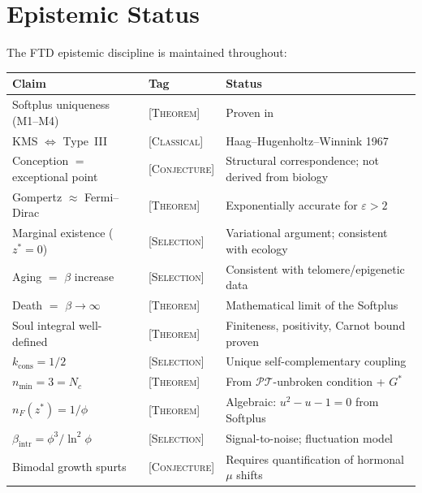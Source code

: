 \documentclass[12pt, letterpaper]{article}
\theoremstyle{plain}
\theoremstyle{definition}
\theoremstyle{remark}
\newcommand{\Gstar}{{G^{*}}}              %
\newcommand{\nF}{n_{\!F}}                 %
\begin{document}
\section{Epistemic Status}
\label{sec:epistemics}

The FTD epistemic discipline is maintained throughout:

\begin{center}
\renewcommand{\arraystretch}{1.35}
\small
\begin{tabular}{@{}llp{6.8cm}@{}}
\toprule
\textbf{Claim} & \textbf{Tag} & \textbf{Status} \\
\midrule
Softplus uniqueness (M1--M4) & \textsc{[Theorem]} & Proven in~\cite{ReLU} \\
KMS $\Leftrightarrow$ Type~III & \textsc{[Classical]} & Haag--Hugenholtz--Winnink 1967 \\
Conception $=$ exceptional point & \textsc{[Conjecture]} & Structural correspondence; not derived from biology \\
Gompertz $\approx$ Fermi--Dirac & \textsc{[Theorem]} & Exponentially accurate for $\varepsilon > 2$ \\
Marginal existence ($z^* = 0$) & \textsc{[Selection]} & Variational argument; consistent with ecology \\
Aging $=$ $\beta$ increase & \textsc{[Selection]} & Consistent with telomere/epigenetic data \\
Death $=$ $\beta \to \infty$ & \textsc{[Theorem]} & Mathematical limit of the Softplus \\
Soul integral well-defined & \textsc{[Theorem]} & Finiteness, positivity, Carnot bound proven \\
$k_{\text{cons}} = 1/2$ & \textsc{[Selection]} & Unique self-complementary coupling \\
$n_{\min} = 3 = N_c$ & \textsc{[Theorem]} & From $\mathcal{PT}$-unbroken condition + $\Gstar$ \\
$\nF(z^*) = 1/\phi$ & \textsc{[Theorem]} & Algebraic: $u^2 - u - 1 = 0$ from Softplus \\
$\beta_{\text{intr}} = \phi^3/\ln^2\!\phi$ & \textsc{[Selection]} & Signal-to-noise; fluctuation model \\
Bimodal growth spurts & \textsc{[Conjecture]} & Requires quantification of hormonal $\mu$ shifts \\
\bottomrule
\end{tabular}
\end{center}
\end{document}
